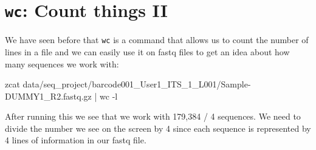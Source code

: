 \documentclass[
  letterpaper,
  DIV=11,
  numbers=noendperiod]{scrreprt}
\newenvironment{Shaded}{}{}
\newcommand{\AttributeTok}[1]{\textcolor[rgb]{0.84,0.23,0.29}{#1}}
\newcommand{\FunctionTok}[1]{\textcolor[rgb]{0.44,0.26,0.76}{#1}}
\newcommand{\KeywordTok}[1]{\textcolor[rgb]{0.84,0.23,0.29}{#1}}
\newcommand{\NormalTok}[1]{\textcolor[rgb]{0.14,0.16,0.18}{#1}}
\begin{document}
\section{\texorpdfstring{\texttt{wc}: Count things
II}{wc: Count things II}}\label{wc-count-things-ii}

We have seen before that \texttt{wc} is a command that allows us to
count the number of lines in a file and we can easily use it on fastq
files to get an idea about how many sequences we work with:

\begin{Shaded}
\begin{Highlighting}[]
\FunctionTok{zcat}\NormalTok{ data/seq\_project/barcode001\_User1\_ITS\_1\_L001/Sample{-}DUMMY1\_R2.fastq.gz }\KeywordTok{|} \FunctionTok{wc} \AttributeTok{{-}l}
\end{Highlighting}
\end{Shaded}

After running this we see that we work with 179,384 / 4 sequences. We
need to divide the number we see on the screen by 4 since each sequence
is represented by 4 lines of information in our fastq file.
\end{document}
